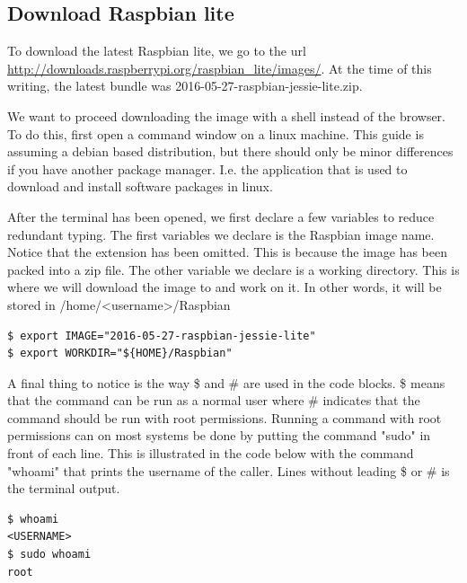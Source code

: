 \subsection{Download Raspbian lite}

To download the latest Raspbian lite, we go to the url
\url{http://downloads.raspberrypi.org/raspbian_lite/images/}.
At the time of this writing, the latest bundle was
2016-05-27-raspbian-jessie-lite.zip.

We want to proceed downloading the image with a shell instead of the browser.
To do this, first open a command window on a linux machine. This guide is
assuming a debian based distribution, but there should only be minor differences
if you have another package manager. I.e. the application that is used to
download and install software packages in linux.

After the terminal has been opened, we first declare a few variables to reduce
redundant typing. The first variables we declare is the Raspbian image name.
Notice that the extension has been omitted. This is because the image has been
packed into a zip file.
The other variable we declare is a working directory. This is where we will
download the image to and work on it. In other words, it will be stored in
/home/<username>/Raspbian


\begin{lstlisting}[]
$ export IMAGE="2016-05-27-raspbian-jessie-lite"
$ export WORKDIR="${HOME}/Raspbian"
\end{lstlisting}
\FloatBarrier
\vspace{-5mm}

A final thing to notice is the way \$ and \# are used in the code blocks. \$
means that the command can be run as a normal user where \# indicates that the
command should be run with root permissions.
Running a command with root permissions can on most systems be done by putting
the command "sudo" in front of each line. This is illustrated in the code below
with the command "whoami" that prints the username of the caller. Lines without
leading \$ or \# is the terminal output.

\begin{lstlisting}[]
$ whoami
<USERNAME>
$ sudo whoami
root
\end{lstlisting}
\FloatBarrier
\vspace{-5mm}

